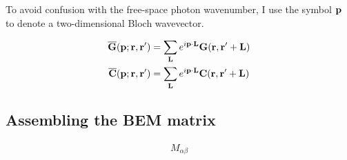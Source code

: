 \documentclass[letterpaper]{article}
\begin{document}
To avoid confusion with the free-space photon wavenumber, 
I use the symbol $\mathbf{p}$ to denote a two-dimensional 
Bloch wavevector.

\begin{align*}
  \overline{\mathbf{G}}(\mathbf{p}; \mathbf{r}, \mathbf{r}^\prime)
&= \sum_{\mathbf{L}} e^{i \mathbf{p} \cdot \mathbf{L}} \mathbf{G}(\mathbf{r}, \mathbf{r}^\prime+\mathbf{L})
\\
  \overline{\mathbf{C}}(\mathbf{p}; \mathbf{r}, \mathbf{r}^\prime)
&= \sum_{\mathbf{L}} e^{i \mathbf{p} \cdot \mathbf{L}} \mathbf{C}(\mathbf{r}, \mathbf{r}^\prime+\mathbf{L})
\end{align*}

\subsection{Assembling the BEM matrix}

\begin{align*}
M_{\alpha\beta}
\end{align*}

\appendix

 
 
 
\end{document}
